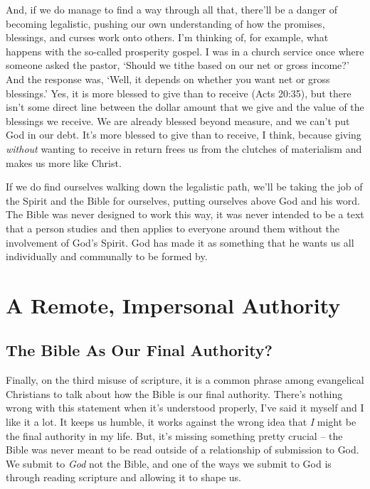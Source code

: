 And, if we do manage to find a way through all that, there'll be a danger of
becoming legalistic, pushing our own understanding of how the promises,
blessings, and curses work onto others. I'm thinking of, for example, what
happens with the so-called prosperity gospel. I was in a church service once
where someone asked the pastor, `Should we tithe based on our net or gross
income?' And the response was, `Well, it depends on whether you want net or
gross blessings.' Yes, it is more blessed to give than to receive (Acts 20:35),
but there isn't some direct line between the dollar amount that we give and the
value of the blessings we receive. We are already blessed beyond measure, and we
can't put God in our debt. It's more blessed to give than to receive, I think,
because giving \textit{without} wanting to receive in return frees us from the
clutches of materialism and makes us more like Christ.

If we do find ourselves walking down the legalistic path, we'll be taking the
job of the Spirit and the Bible for ourselves, putting ourselves above God and
his word. The Bible was never designed to work this way, it was never intended
to be a text that a person studies and then applies to everyone around them
without the involvement of God's Spirit. God has made it as something that he
wants us all individually and communally to be formed by.

\section{A Remote, Impersonal Authority}

\subsection{The Bible As Our Final Authority?}

Finally, on the third misuse of scripture, it is a common phrase among
evangelical Christians to talk about how the Bible is our final authority.
There's nothing wrong with this statement when it's understood properly, I've
said it myself and I like it a lot. It keeps us humble, it works against the
wrong idea that \textit{I} might be the final authority in my life. But, it's
missing something pretty crucial -- the Bible was never meant to be read outside
of a relationship of submission to God. We submit to \textit{God} not the Bible,
and one of the ways we submit to God is through reading scripture and allowing
it to shape us.

